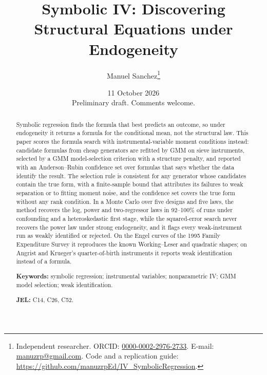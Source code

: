 \documentclass[11pt,a4paper]{article}
\title{Symbolic IV: Discovering Structural Equations under Endogeneity}
\author{Manuel Sanchez\thanks{Independent researcher. ORCID: \href{https://orcid.org/0000-0002-2976-2733}{0000-0002-2976-2733}. E-mail: \href{mailto:manuzrp@gmail.com}{manuzrp@gmail.com}. Code and a replication guide: \url{https://github.com/manuzrpEd/IV_SymbolicRegression}.}}
\date{11 October 2026\\[4pt]\normalsize Preliminary draft. Comments welcome.}
\begin{document}
\maketitle

\begin{abstract}
\noindent Symbolic regression finds the formula that best predicts an outcome, so under endogeneity it returns a formula for the conditional mean, not the structural law. This paper scores the formula search with instrumental-variable moment conditions instead: candidate formulas from cheap generators are refitted by GMM on sieve instruments, selected by a GMM model-selection criterion with a structure penalty, and reported with an Anderson--Rubin confidence set over formulas that says whether the data identify the result. The selection rule is consistent for any generator whose candidates contain the true form, with a finite-sample bound that attributes its failures to weak separation or to fitting moment noise, and the confidence set covers the true form without any rank condition. In a Monte Carlo over five designs and five laws, the method recovers the log, power and two-regressor laws in 92--100\% of runs under confounding and a heteroskedastic first stage, while the squared-error search never recovers the power law under strong endogeneity, and it flags every weak-instrument run as weakly identified or rejected. On the Engel curves of the 1995 Family Expenditure Survey it reproduces the known Working--Leser and quadratic shapes; on Angrist and Krueger's quarter-of-birth instruments it reports weak identification instead of a formula.

\medskip\noindent\textbf{Keywords:} symbolic regression; instrumental variables; nonparametric IV; GMM model selection; weak identification.

\noindent\textbf{JEL:} C14, C26, C52.
\end{abstract}

\newpage









\end{document}
